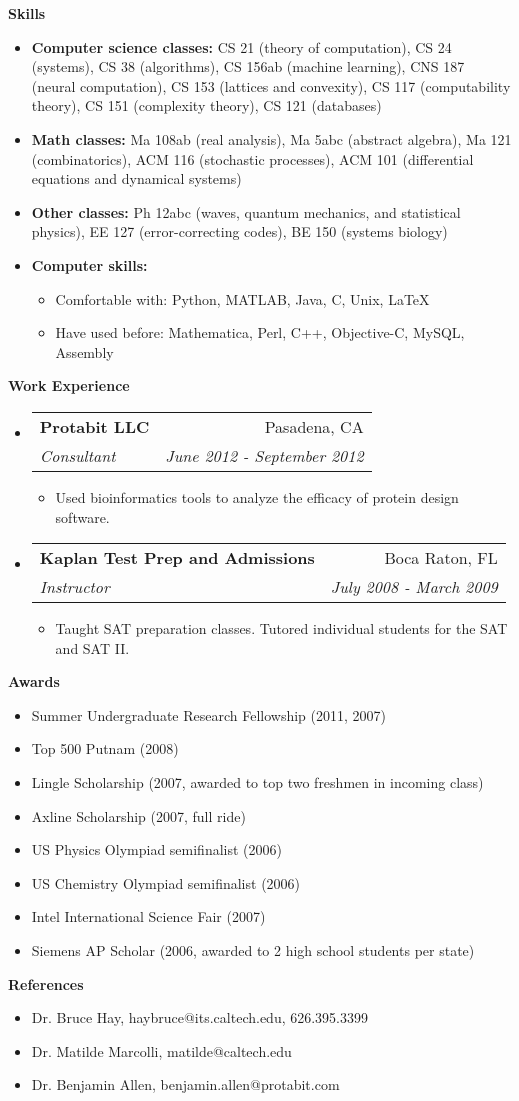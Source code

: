 \documentclass[letterpaper,11pt]{article}
\makeatletter
\newcommand{\resitem}[1]{\item #1 \vspace{-2pt}}
\newcommand{\resheading}[1]{{\large \colorbox{mygrey}{\begin{minipage}{\textwidth}{\textbf{#1 \vphantom{p\^{E}}}}\end{minipage}}}}
\newcommand{\ressubheading}[4]{
\begin{tabular*}{7.0in}{l@{\extracolsep{\fill}}r}
		\textbf{#1} & #2 \\
		\textit{#3} & \textit{#4} \\
\end{tabular*}\vspace{-6pt}}
\makeatother
\begin{document}
\resheading{Skills}
\begin{itemize}
\item \textbf{Computer science classes:} CS 21 (theory of computation), CS 24 (systems), CS 38 (algorithms), CS 156ab (machine learning), CNS 187 (neural computation), CS 153 (lattices and convexity), CS 117 (computability theory), CS 151 (complexity theory), CS 121 (databases)
\item \textbf{Math classes:}  Ma 108ab (real analysis), Ma 5abc (abstract algebra), Ma 121 (combinatorics), ACM 116 (stochastic processes), ACM 101 (differential equations and dynamical systems)
\item \textbf{Other classes:} Ph 12abc (waves, quantum mechanics, and statistical physics), EE 127 (error-correcting codes), BE 150 (systems biology)
\item \textbf{Computer skills:}
	\begin{itemize}
	\item Comfortable with: Python, MATLAB, Java, C, Unix, LaTeX
	\item Have used before: Mathematica, Perl, C++, Objective-C, MySQL, Assembly
	\end{itemize}
\end{itemize}

\resheading{Work Experience}
\begin{itemize}
\item
	\ressubheading{Protabit LLC}{Pasadena, CA}{Consultant}{June 2012 - September 2012}
	\begin{itemize}
		\resitem{Used bioinformatics tools to analyze the efficacy of protein design software.}
	\end{itemize}
\item
	\ressubheading{Kaplan Test Prep and Admissions}{Boca Raton, FL}{Instructor}{July 2008 - March 2009}
	\begin{itemize}
		\resitem{Taught SAT preparation classes.  Tutored individual students for the SAT and SAT II.}
	\end{itemize}
\end{itemize}

\resheading{Awards}
\begin{itemize}
    \item Summer Undergraduate Research Fellowship (2011, 2007)
	\item Top 500 Putnam (2008)
	\item Lingle Scholarship (2007, awarded to top two freshmen in incoming class)
	\item Axline Scholarship (2007, full ride)
	\item US Physics Olympiad semifinalist (2006)
	\item US Chemistry Olympiad semifinalist (2006)
	\item Intel International Science Fair (2007)
	\item Siemens AP Scholar (2006, awarded to 2 high school students per state)
\end{itemize}

\resheading{References}
\begin{itemize}
\item Dr. Bruce Hay, haybruce@its.caltech.edu, 626.395.3399
\item Dr. Matilde Marcolli, matilde@caltech.edu
\item Dr. Benjamin Allen, benjamin.allen@protabit.com
\end{itemize}
\end{document}
